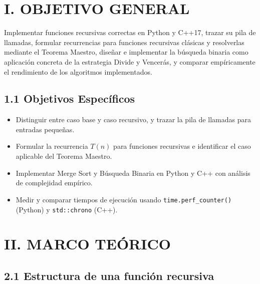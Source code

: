 \documentclass[12pt,a4paper]{article}
\begin{document}
\newpage

\section*{I. OBJETIVO GENERAL}

Implementar funciones recursivas correctas en Python y C++17, trazar su pila de
llamadas, formular recurrencias para funciones recursivas clásicas y resolverlas
mediante el Teorema Maestro, diseñar e implementar la búsqueda binaria como
aplicación concreta de la estrategia Divide y Vencerás, y comparar empíricamente
el rendimiento de los algoritmos implementados.

\subsection*{1.1 Objetivos Específicos}

\begin{itemize}[leftmargin=*]
    \item Distinguir entre caso base y caso recursivo, y trazar la pila de
    llamadas para entradas pequeñas.
    \item Formular la recurrencia $T(n)$ para funciones recursivas e identificar
    el caso aplicable del Teorema Maestro.
    \item Implementar Merge Sort y Búsqueda Binaria en Python y C++ con análisis
    de complejidad empírico.
    \item Medir y comparar tiempos de ejecución usando \texttt{time.perf\_counter()}
    (Python) y \texttt{std::chrono} (C++).
\end{itemize}

\section*{II. MARCO TEÓRICO}

\subsection*{2.1 Estructura de una función recursiva}
\end{document}
